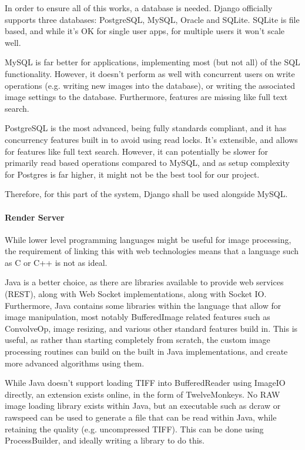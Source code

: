 \documentclass[12pt,a4paper]{article}
\begin{document}
In order to ensure all of this works, a database is needed. Django officially supports three databases:
PostgreSQL, MySQL, Oracle and SQLite. SQLite is file based, and while it's OK for single user apps, for
multiple users it won't scale well.

MySQL is far better for applications, implementing most (but not all) of the SQL functionality. However,
it doesn't perform as well with concurrent users on write operations (e.g. writing new images into the database),
or writing the associated image settings to the database. Furthermore, features are missing like full text search.

 PostgreSQL is the most advanced, being fully standards compliant, and it has concurrency features built in to avoid using read locks.
 It's extensible, and allows for features like full text search. However, it can potentially be slower for primarily read based operations
 compared to MySQL, and as setup complexity for Postgres is far higher, it might not be the best tool for our project. \cite{ComparisonOfDatabaseBackends}

 Therefore, for this part of the system, Django shall be used alongside MySQL.
\paragraph{Render Server}
While lower level programming languages might be useful for image processing,
the requirement of linking this with web technologies means that a language such as C
or C++ is not as ideal.

Java is a better choice, as there are libraries available to provide web services (REST),
along with Web Socket implementations, along with Socket IO. Furthermore, Java contains
some libraries within the language that allow for image manipulation, most notably
BufferedImage related features such as ConvolveOp, image resizing, and various other standard
features build in. This is useful, as rather than starting completely from scratch, the custom
image processing routines can build on the built in Java implementations, and create more advanced
algorithms using them.

While Java doesn't support loading TIFF into BufferedReader using ImageIO directly,
an extension exists online, in the form of TwelveMonkeys. No RAW image loading library
exists within Java, but an executable such as dcraw or rawspeed can be used to generate a file
that can be read within Java, while retaining the quality (e.g. uncompressed TIFF). This can be done
using ProcessBuilder, and ideally writing a library to do this.
\end{document}
